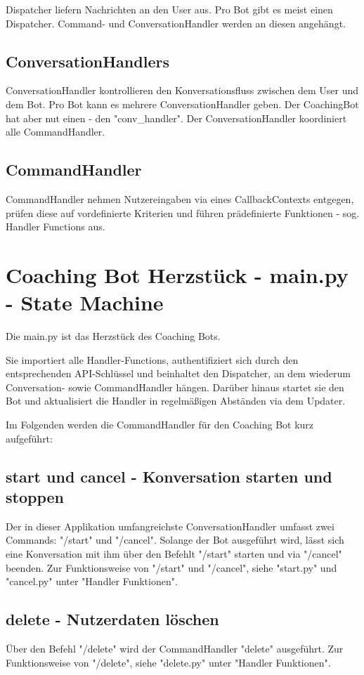 Dispatcher liefern Nachrichten an den User aus. Pro Bot gibt es meist einen Dispatcher. Command- und ConversationHandler werden an diesen angehängt.


\subsection{ConversationHandlers}

ConversationHandler kontrollieren den Konversationsfluss zwischen dem User und dem Bot. Pro Bot kann es mehrere ConversationHandler geben. Der CoachingBot hat aber nut einen - den "conv_handler". Der ConversationHandler koordiniert alle CommandHandler.


\subsection{CommandHandler}

CommandHandler nehmen Nutzereingaben via eines CallbackContexts entgegen, prüfen diese auf vordefinierte Kriterien und führen prädefinierte Funktionen - sog. Handler Functions aus.


\section{Coaching Bot Herzstück - main.py - State Machine}
Die main.py ist das Herzstück des Coaching Bots.

Sie importiert alle Handler-Functions, authentifiziert sich durch den entsprechenden API-Schlüssel und beinhaltet den Dispatcher, an dem wiederum Conversation- sowie CommandHandler hängen. Darüber hinaus startet sie den Bot und aktualisiert die Handler in regelmäßigen Abständen via dem Updater.

Im Folgenden werden die CommandHandler für den Coaching Bot kurz aufgeführt:

\subsection{start und cancel - Konversation starten und stoppen}
Der in dieser Applikation umfangreichste ConversationHandler umfasst zwei Commands: "/start" und "/cancel". Solange der Bot ausgeführt wird, lässt sich eine Konversation mit ihm über den Befehlt "/start" starten und via "/cancel" beenden. Zur Funktionsweise von "/start" und "/cancel", siehe "start.py" und "cancel.py" unter "Handler Funktionen". 

\subsection{delete - Nutzerdaten löschen}
Über den Befehl "/delete" wird der CommandHandler "delete" ausgeführt. Zur Funktionsweise von "/delete", siehe "delete.py" unter "Handler Funktionen". 

